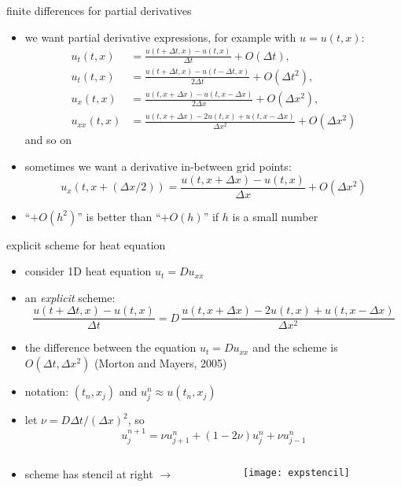 \begin{frame}{finite differences for partial derivatives}

\begin{itemize}
\item we want partial derivative expressions, for example with $u=u(t,x)$:
\small
\begin{align*}
u_t(t,x) &= \frac{u(t+\Delta t,x) - u(t,x)}{\Delta t} + O(\Delta t), \\
u_t(t,x) &= \frac{u(t+\Delta t,x) - u(t-\Delta t,x)}{2\Delta t} + O(\Delta t^2), \\
u_x(t,x) &= \frac{u(t,x+\Delta x) - u(t,x-\Delta x)}{2\Delta x} + O(\Delta x^2), \\
u_{xx}(t,x) &= \frac{u(t,x+\Delta x) - 2 u(t,x) + u(t,x-\Delta x)}{\Delta x^2} + O(\Delta x^2)
\end{align*}
\normalsize
and so on
\item sometimes we want a derivative in-between grid points:
\small
	$$u_x(t,x+(\Delta x/2)) = \frac{u(t,x+\Delta x) - u(t,x)}{\Delta x} + O(\Delta x^2)$$
\normalsize
\item ``$+O(h^2)$'' is better than ``$+O(h)$'' if $h$ is a small number
\end{itemize}
\end{frame}


\begin{frame}{explicit scheme for heat equation}
\label{slide:explicit}

\begin{itemize}
\item consider 1D heat equation $u_t = D u_{xx}$
\item an \emph{explicit} scheme:
\small
	$$\frac{u(t+\Delta t,x) - u(t,x)}{\Delta t} = D\,\frac{u(t,x+\Delta x) - 2 u(t,x) + u(t,x-\Delta x)}{\Delta x^2}$$
\normalsize
\item the difference between the equation $u_t = D u_{xx}$ and the scheme is $O(\Delta t,\Delta x^2)$ (Morton and Mayers, 2005)\nocite{MortonMayers}
\item notation: $(t_n,x_j)$ and $u_j^n \approx u(t_n,x_j)$
\item let $\nu = D \Delta t / (\Delta x)^2$, so
\small
	$$u_j^{n+1} = \nu u_{j+1}^n + (1 - 2 \nu) u_j^n + \nu u_{j-1}^n$$
\normalsize
\end{itemize}
\begin{columns}
\begin{column}{0.55\textwidth}
\begin{itemize}
\item scheme has stencil at right \large $\to$ \normalsize
\end{itemize}
\end{column}
\begin{column}{0.45\textwidth}
\texttt{[image: expstencil]}
\end{column}
\end{columns}
\end{frame}


